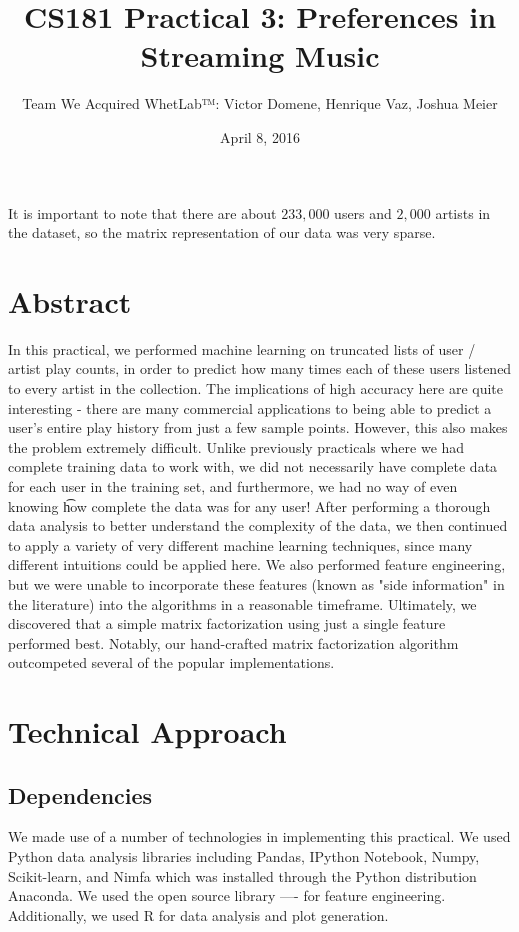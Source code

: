 \documentclass[10pt]{article}
\title{CS181 Practical 3: Preferences in Streaming Music}
\author{Team We Acquired WhetLab™: Victor Domene, Henrique Vaz, Joshua Meier }
\date{April 8, 2016}
\begin{document}
\maketitle

 It is important to note that there are about $233,000$ users and $2,000$ artists in the dataset, so the matrix representation of our data was very sparse. 


\section{Abstract}
In this practical, we performed machine learning on truncated lists of user / artist play counts, in order to predict how many times each of these users listened to every artist in the collection. The implications of high accuracy here are quite interesting - there are many commercial applications to being able to predict a user's entire play history from just a few sample points. However, this also makes the problem extremely difficult. Unlike previously practicals where we had complete training data to work with, we did not necessarily have complete data for each user in the training set, and furthermore, we had no way of even knowing {\t how} complete the data was for any user! After performing a thorough data analysis to better understand the complexity of the data, we then continued to apply a variety of very different machine learning techniques, since many different intuitions could be applied here. We also performed feature engineering, but we were unable to incorporate these features (known as "side information" in the literature) into the algorithms in a reasonable timeframe. Ultimately, we discovered that a simple matrix factorization using just a single feature performed best. Notably, our hand-crafted matrix factorization algorithm outcompeted several of the popular implementations. 

\section{Technical Approach}
\subsection{Dependencies}

We made use of a number of technologies in implementing this practical. We used Python data analysis libraries including Pandas, IPython Notebook, Numpy, Scikit-learn, and Nimfa which was installed through the Python distribution Anaconda. We used the open source library ---- for feature engineering. Additionally, we used R for data analysis and plot generation.
\end{document}
